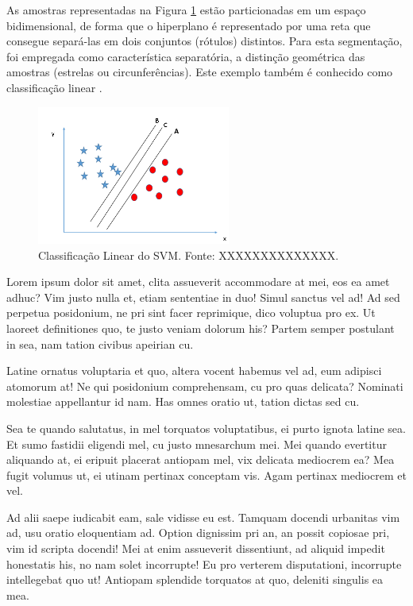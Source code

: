 \documentclass[
	12pt,				%
	openright,			%
	oneside,			%
	a4paper,			%
	english,			%
	french,				%
	spanish,			%
	brazil,				%
	]{abntex2}
\begin{document}
As amostras representadas na Figura \ref{fig:svm1} estão particionadas em um espaço bidimensional, de forma que o hiperplano é representado por uma reta que consegue separá-las em dois conjuntos (rótulos) distintos. Para esta segmentação, foi empregada como característica separatória, a distinção geométrica das amostras (estrelas ou circunferências). Este exemplo também é conhecido como classificação linear \cite{svm2}.
\begin{figure}
    \centering
    \includegraphics[width=2.5in]{Images/svm-3.png}
    \caption{Classificação Linear do SVM. Fonte: XXXXXXXXXXXXXX.}
    \label{fig:svm1}
\end{figure}

Lorem ipsum dolor sit amet, clita assueverit accommodare at mei, eos ea amet adhuc? Vim justo nulla et, etiam sententiae in duo! Simul sanctus vel ad! Ad sed perpetua posidonium, ne pri sint facer reprimique, dico voluptua pro ex. Ut laoreet definitiones quo, te justo veniam dolorum his? Partem semper postulant in sea, nam tation civibus apeirian cu.

Latine ornatus voluptaria et quo, altera vocent habemus vel ad, eum adipisci atomorum at! Ne qui posidonium comprehensam, cu pro quas delicata? Nominati molestiae appellantur id nam. Has omnes oratio ut, tation dictas sed cu.

Sea te quando salutatus, in mel torquatos voluptatibus, ei purto ignota latine sea. Et sumo fastidii eligendi mel, cu justo mnesarchum mei. Mei quando evertitur aliquando at, ei eripuit placerat antiopam mel, vix delicata mediocrem ea? Mea fugit volumus ut, ei utinam pertinax conceptam vis. Agam pertinax mediocrem et vel.

Ad alii saepe iudicabit eam, sale vidisse eu est. Tamquam docendi urbanitas vim ad, usu oratio eloquentiam ad. Option dignissim pri an, an possit copiosae pri, vim id scripta docendi! Mei at enim assueverit dissentiunt, ad aliquid impedit honestatis his, no nam solet incorrupte! Eu pro verterem disputationi, incorrupte intellegebat quo ut! Antiopam splendide torquatos at quo, deleniti singulis ea mea.
\end{document}

